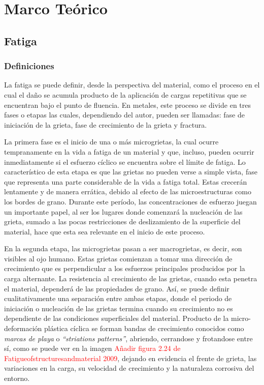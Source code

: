 \chapter{Marco Teórico}
\section{Fatiga}

\subsection{Definiciones}
La fatiga se puede definir, desde la perspectiva del material, como el proceso en el cual el daño se acumula producto de la aplicación de cargas repetitivas que se encuentran bajo el punto de fluencia. En metales, este proceso se divide en tres fases o etapas las cuales, dependiendo del autor, pueden ser llamadas: fase de iniciación de la grieta, fase de crecimiento de la grieta y fractura.

La primera fase es el inicio de una o más microgrietas, la cual ocurre tempranamente en la vida a fatiga de un material y que, incluso, pueden ocurrir inmediatamente si el esfuerzo cíclico se encuentra sobre el límite de fatiga. Lo característico de esta etapa es que las grietas no pueden verse a simple vista, fase que representa una parte considerable de la vida a fatiga total. Estas crecerán lentamente y de manera errática, debido al efecto de las microestructuras como los bordes de grano. Durante este período, las concentraciones de esfuerzo juegan un importante papel, al ser los lugares donde comenzará la nucleación de las grieta, sumado a las pocas restricciones de deslizamiento de la superficie del material, hace que esta sea relevante en el inicio de este proceso.

En la segunda etapa, las microgrietas pasan a ser macrogrietas, es decir, son visibles al ojo humano. Estas grietas comienzan a tomar una dirección de crecimiento que es perpendicular a los esfuerzos principales producidos por la carga alternante. La resistencia al crecimiento de las grietas, cuando esta penetra el material, dependerá de las propiedades de grano. Así, se puede definir cualitativamente una separación entre ambas etapas, donde el periodo de iniciación o nucleación de las grietas termina cuando su crecimiento no es dependiente de las condiciones superficiales del material. Producto de la micro-deformación plástica cíclica se forman bandas de crecimiento conocidos como \textit{marcas de playa} o \textit{``striations patterns''}, abriendo, cerrandose y frotandose entre sí, como se puede ver en la imagen \textcolor{red}{Añadir figura 2.24 de Fatigueofstructuresandmaterial 2009}, dejando en evidencia el frente de grieta, las variaciones en la carga, su velocidad de crecimiento y la naturaleza corrosiva del entorno.

